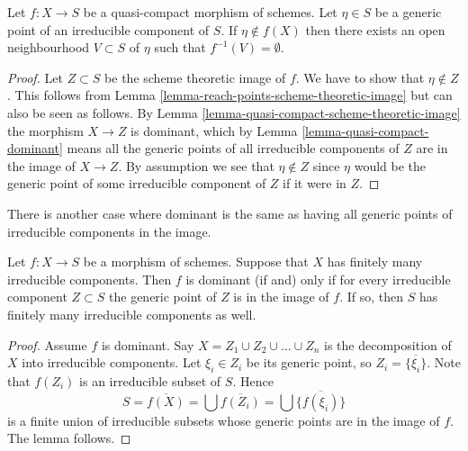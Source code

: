 \begin{lemma}
\label{lemma-quasi-compact-generic-point-not-in-image}
Let $f : X \to S$ be a quasi-compact morphism of schemes.
Let $\eta \in S$ be a generic point of an irreducible
component of $S$. If $\eta \not \in f(X)$ then there
exists an open neighbourhood $V \subset S$ of $\eta$
such that $f^{-1}(V) = \emptyset$.
\end{lemma}

\begin{proof}
Let $Z \subset S$ be the scheme theoretic image of $f$.
We have to show that $\eta \not \in Z$.
This follows from
Lemma \ref{lemma-reach-points-scheme-theoretic-image}
but can also be seen as follows.
By Lemma \ref{lemma-quasi-compact-scheme-theoretic-image}
the morphism $X \to Z$ is dominant, which by
Lemma \ref{lemma-quasi-compact-dominant}
means all the generic points of all irreducible components of $Z$
are in the image of $X \to Z$. By assumption we see that
$\eta \not \in Z$ since $\eta$ would be the generic
point of some irreducible component of $Z$ if it were in $Z$.
\end{proof}

\noindent
There is another case where dominant is the same as having all
generic points of irreducible components in the image.

\begin{lemma}
\label{lemma-dominant-finite-number-irreducible-components}
Let $f : X \to S$ be a morphism of schemes.
Suppose that $X$ has finitely many irreducible components.
Then $f$ is dominant (if and) only if for every irreducible
component $Z \subset S$ the generic point of $Z$ is in the
image of $f$. If so, then $S$ has finitely many irreducible
components as well.
\end{lemma}

\begin{proof}
Assume $f$ is dominant.
Say $X = Z_1 \cup Z_2 \cup \ldots \cup Z_n$ is the decomposition
of $X$ into irreducible components. Let $\xi_i \in Z_i$ be
its generic point, so $Z_i = \overline{\{\xi_i\}}$.
Note that $f(Z_i)$ is an irreducible subset of $S$.
Hence
$$
S = \overline{f(X)} = \bigcup \overline{f(Z_i)} =
\bigcup \overline{\{f(\xi_i)\}}
$$
is a finite union of irreducible subsets whose generic
points are in the image of $f$. The lemma follows.
\end{proof}

